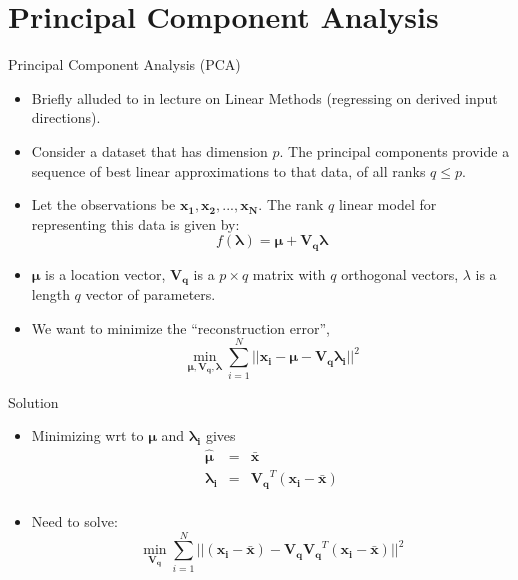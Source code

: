 \documentclass{beamer}
\let \vec \mathbf
\begin{document}
\section{Principal Component Analysis}


\begin{frame}{Principal Component Analysis (PCA)}
    \begin{itemize}
        \item Briefly alluded to in lecture on Linear Methods (regressing on derived input directions).
        \item Consider a dataset that has dimension $p$. The principal components provide a sequence of best linear approximations to that data, of all ranks $q \leq p$.
        \item Let the observations be $\vec{x_1}, \vec{x_2}, ..., \vec{x_N}$. The rank $q$ linear model for representing this data is given by:
        \begin{equation*}
            f(\vec{\lambda}) = \vec{\mu} + \vec{V_q}\vec{\lambda}
        \end{equation*}
        \item $\vec{\mu}$ is a location vector, $\vec{V_q}$ is a $p \times q$ matrix with $q$ orthogonal vectors, $\lambda$ is a length $q$ vector of parameters.
        \item We want to minimize the ``reconstruction error'',
        \begin{equation*}
            \min_{\vec{\mu}, \vec{V_q}, \vec{\lambda}} \sum_{i=1}^N ||\vec{x_i} - \vec{\mu} - \vec{V_q}\vec{\lambda_i}||^2
        \end{equation*}
    \end{itemize}
\end{frame} 

\begin{frame}{Solution}
    \begin{itemize}
        \item Minimizing wrt to $\vec{\mu}$ and $\vec{\lambda_i}$ gives
        \begin{eqnarray*}
        \hat{\vec{\mu}} & = & \bar{\vec{x}}\\
        \vec{\lambda_i} & = & \vec{V_q}^T(\vec{x_i}-\bar{\vec{x}})\\
    \end{eqnarray*}
        \item Need to solve:
        \begin{equation*}
          \min_{\vec{V_q}} \sum_{i=1}^N ||(\vec{x_i}-\bar{\vec{x}}) - \vec{V_q}\vec{V_q}^T(\vec{x_i}-\bar{\vec{x}})||^2
        \end{equation*}
    \end{itemize}
\end{frame} 
\end{document}
